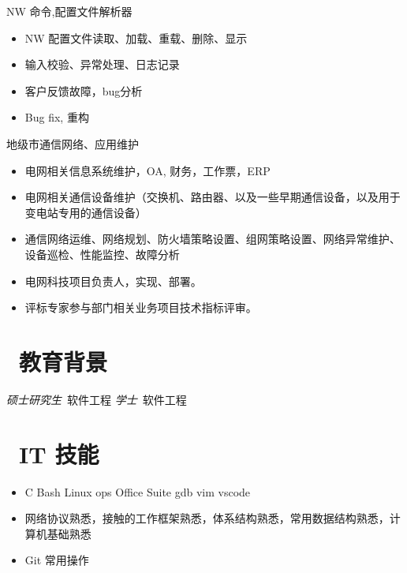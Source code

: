 \documentclass{resume}
\begin{document}
\begin{onehalfspacing}
NW 命令,配置文件解析器 
\begin{itemize}
	\item NW 配置文件读取、加载、重载、删除、显示
	\item 输入校验、异常处理、日志记录
	\item 客户反馈故障，bug分析
	\item Bug fix, 重构
\end{itemize}
\end{onehalfspacing}

\begin{onehalfspacing}
地级市通信网络、应用维护
\begin{itemize}
\item 电网相关信息系统维护，OA, 财务，工作票，ERP
\item 电网相关通信设备维护（交换机、路由器、以及一些早期通信设备，以及用于变电站专用的通信设备）
\item 通信网络运维、网络规划、防火墙策略设置、组网策略设置、网络异常维护、设备巡检、性能监控、故障分析
\item 电网科技项目负责人，实现、部署。
\item 评标专家参与部门相关业务项目技术指标评审。
\end{itemize}
\end{onehalfspacing}


\section{\faGraduationCap\  教育背景}
\textit{硕士研究生}\ 软件工程
\textit{学士}\ 软件工程

\section{\faCogs\ IT 技能}
\begin{itemize}[parsep=0.5ex]
  \item C Bash Linux ops Office Suite gdb vim vscode
  \item 网络协议熟悉，接触的工作框架熟悉，体系结构熟悉，常用数据结构熟悉，计算机基础熟悉
  \item Git 常用操作 
\end{itemize}
\end{document}
